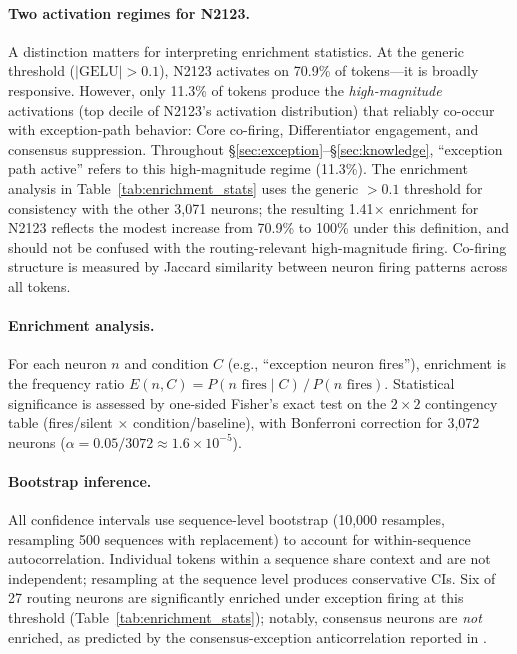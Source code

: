 \documentclass{article}
\begin{document}
\paragraph{Two activation regimes for N2123.}
A distinction matters for interpreting enrichment statistics.
At the generic threshold ($|\text{GELU}| > 0.1$), N2123 activates on 70.9\% of tokens---it is broadly responsive.
However, only 11.3\% of tokens produce the \emph{high-magnitude} activations
(top decile of N2123's activation distribution)
that reliably co-occur with exception-path behavior:
Core co-firing, Differentiator engagement, and consensus suppression.
Throughout \S\ref{sec:exception}--\S\ref{sec:knowledge}, ``exception path active''
refers to this high-magnitude regime (11.3\%).
The enrichment analysis in Table~\ref{tab:enrichment_stats} uses the generic
$> 0.1$ threshold for consistency with the other 3{,}071 neurons;
the resulting 1.41$\times$ enrichment for N2123 reflects the modest increase
from 70.9\% to 100\% under this definition, and should not be confused with
the routing-relevant high-magnitude firing.
Co-firing structure is measured by Jaccard similarity between neuron firing
patterns across all tokens.

\paragraph{Enrichment analysis.}
For each neuron $n$ and condition $C$ (e.g., ``exception neuron fires''),
enrichment is the frequency ratio
$E(n, C) = P(n \text{ fires} \mid C) \,/\, P(n \text{ fires})$.
Statistical significance is assessed by one-sided Fisher's exact test on the
$2 \times 2$ contingency table (fires/silent $\times$ condition/baseline),
with Bonferroni correction for 3{,}072 neurons ($\alpha = 0.05 / 3072 \approx
1.6 \times 10^{-5}$).

\paragraph{Bootstrap inference.}
All confidence intervals use sequence-level bootstrap (10{,}000 resamples,
resampling 500 sequences with replacement) to account for within-sequence
autocorrelation. Individual tokens within a sequence share context and are
not independent; resampling at the sequence level produces conservative CIs.
Six of 27 routing neurons are significantly enriched under exception firing
at this threshold (Table~\ref{tab:enrichment_stats}); notably, consensus neurons
are \emph{not} enriched, as predicted by the consensus-exception anticorrelation
reported in \citet{balogh2026discrete}.
\end{document}
